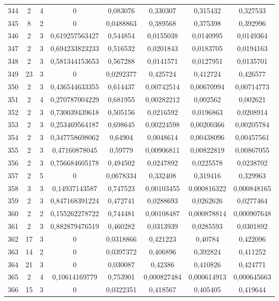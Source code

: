 \begin{longtable}{|c|c|c|c|c|c|c|c|}
344 & 2 & 4 & 0 & 0,083076 & 0,330307 & 0,315432 & 0,327533  \\
345 & 8 & 2 & 0 & 0,0488863 & 0,389568 & 0,375398 & 0,392996  \\
346 & 2 & 3 & 0,619257563427 & 0,544854 & 0,0155038 & 0,0140995 & 0,0149364  \\
347 & 2 & 3 & 0,694233823233 & 0,516532 & 0,0201843 & 0,0183705 & 0,0194163  \\
348 & 2 & 3 & 0,581344153653 & 0,567288 & 0,0141571 & 0,0127951 & 0,0135701  \\
349 & 23 & 3 & 0 & 0,0292377 & 0,425724 & 0,412724 & 0,426577  \\
350 & 2 & 3 & 0,436544633355 & 0,614437 & 0,00742514 & 0,00670994 & 0,00714773  \\
351 & 2 & 4 & 0,270787004229 & 0,681955 & 0,00282212 & 0,002562 & 0,002621  \\
352 & 2 & 3 & 0,730039439618 & 0,505156 & 0,0216592 & 0,0196863 & 0,0208914  \\
353 & 2 & 3 & 0,253469564187 & 0,698645 & 0,00224598 & 0,00200366 & 0,00205784  \\
354 & 2 & 3 & 0,347758698062 & 0,64904 & 0,0048614 & 0,00438096 & 0,00457561  \\
355 & 2 & 3 & 0,47160878045 & 0,59779 & 0,00906811 & 0,00822819 & 0,00867055  \\
356 & 2 & 3 & 0,756684605178 & 0,494502 & 0,0247892 & 0,0225578 & 0,0238702  \\
357 & 2 & 5 & 0 & 0,0678334 & 0,332408 & 0,319416 & 0,329963  \\
358 & 3 & 3 & 0,14937143587 & 0,747523 & 0,00103455 & 0,000816322 & 0,000848165  \\
359 & 2 & 3 & 0,847168391224 & 0,472741 & 0,0288693 & 0,0262626 & 0,0277464  \\
360 & 2 & 2 & 0,155262278722 & 0,744481 & 0,00108487 & 0,000878814 & 0,000907648  \\
361 & 2 & 3 & 0,882879476519 & 0,460282 & 0,0313939 & 0,0285593 & 0,0301892  \\
362 & 17 & 3 & 0 & 0,0318866 & 0,421223 & 0,40784 & 0,422096  \\
363 & 14 & 2 & 0 & 0,0397372 & 0,406896 & 0,392824 & 0,411252  \\
364 & 21 & 3 & 0 & 0,030087 & 0,42386 & 0,410826 & 0,424771  \\
365 & 2 & 4 & 0,10614169779 & 0,753901 & 0,000827484 & 0,000614913 & 0,000645663  \\
366 & 15 & 3 & 0 & 0,0322351 & 0,418567 & 0,405405 & 0,419644  \\

\end{longtable}
